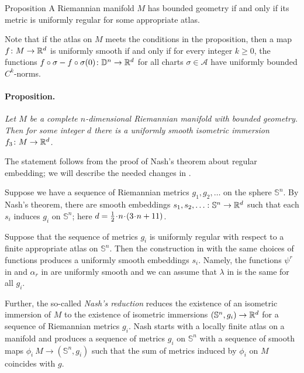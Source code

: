 \documentclass[a4paper,10pt]{article}
\begin{document}
\begin{thm}{Proposition}
A Riemannian manifold $M$ has bounded geometry if and only if its metric is uniformly regular for some appropriate atlas.
\end{thm}

Note that if the atlas on $M$ meets the conditions in the proposition,
then a map $f\colon M\to \mathbb{R}^d$ is uniformly smooth if and only if for every integer $k\ge 0$,
the functions $f\circ\sigma-f\circ\sigma(0)\colon \mathbb{D}^n\to \mathbb{R}^d$ for all charts $\sigma\in \mathcal{A}$
have uniformly bounded $C^k$-norms.


\paragraph{Proposition.}\label{par:nash}
\textit{Let $M$ be a complete $n$-dimensional Riemannian manifold with bounded geometry.
Then for some integer $d$ there is a uniformly smooth isometric immersion $f_3\colon M\to\mathbb{R}^d$.}

\medskip

The statement follows from the proof of Nash's theorem about regular embedding;
we will describe the needed changes in \cite{nash}.

Suppose we have a sequence of Riemannian metrics $g_1,g_2,\dots $ on the sphere $\mathbb{S}^n$.
By Nash's theorem, there are smooth embeddings $s_1,s_2,\z\dots\:\mathbb{S}^n\to \RR^d$
such that each $s_i$ induces $g_i$ on $\mathbb{S}^n$; here $d\z=\tfrac12\cdot n\cdot(3\cdot n+11)$.

Suppose that the sequence of metrics $g_i$ is uniformly regular with respect to a finite appropriate atlas on $\mathbb{S}^n$.
Then the construction in \cite[Part C]{nash} with the same choices of functions produces a uniformly smooth embeddings $s_i$.
Namely, the functions $\psi^r$ in \cite[(C2)]{nash} and $\alpha_r$ in \cite[(C10)]{nash} are uniformly smooth and we can assume that $\lambda$ in \cite[(C12)]{nash} is the same for all $g_i$. 

Further, the so-called \emph{Nash's reduction} \cite[Part D]{nash} reduces the existence of an isometric immersion of $M$ to the existence of isometric immersions $(\mathbb{S}^n,g_i)\to \mathbb{R}^d$ for a sequence of Riemannian metrics $g_i$.
Nash starts with a locally finite atlas on a manifold and produces a sequence of metrics $g_i$ on $\mathbb{S}^n$ with a sequence of smooth maps $\phi_i\:M\to (\mathbb{S}^n,g_i)$ 
such that the sum of metrics induced by $\phi_i$ on $M$ coincides with $g$.
\end{document}
